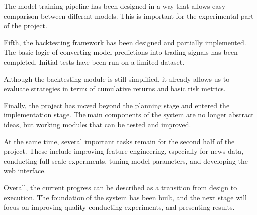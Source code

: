\documentclass[12pt,a4paper]{article}
\begin{document}
The model training pipeline has been designed in a way that allows easy comparison between different models. This is important for the experimental part of the project.

Fifth, the backtesting framework has been designed and partially implemented. The basic logic of converting model predictions into trading signals has been completed. Initial tests have been run on a limited dataset.

Although the backtesting module is still simplified, it already allows us to evaluate strategies in terms of cumulative returns and basic risk metrics.

Finally, the project has moved beyond the planning stage and entered the implementation stage. The main components of the system are no longer abstract ideas, but working modules that can be tested and improved.

At the same time, several important tasks remain for the second half of the project. These include improving feature engineering, especially for news data, conducting full-scale experiments, tuning model parameters, and developing the web interface.

Overall, the current progress can be described as a transition from design to execution. The foundation of the system has been built, and the next stage will focus on improving quality, conducting experiments, and presenting results.

\newpage
\end{document}
